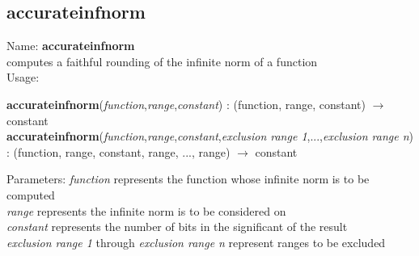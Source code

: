 \subsection{ accurateinfnorm }
\noindent Name: \textbf{accurateinfnorm}\\
computes a faithful rounding of the infinite norm of a function \\

\noindent Usage: 
\begin{center}
\textbf{accurateinfnorm}(\emph{function},\emph{range},\emph{constant}) : (\textsf{function}, \textsf{range}, \textsf{constant}) $\rightarrow$ \textsf{constant}\\
\textbf{accurateinfnorm}(\emph{function},\emph{range},\emph{constant},\emph{exclusion range 1},...,\emph{exclusion range n}) : (\textsf{function}, \textsf{range}, \textsf{constant}, \textsf{range}, ..., \textsf{range}) $\rightarrow$ \textsf{constant}\\
\end{center}
Parameters: 
\emph{function} represents the function whose infinite norm is to be computed\\
\emph{range} represents the infinite norm is to be considered on\\
\emph{constant} represents the number of bits in the significant of the result\\
\emph{exclusion range 1} through \emph{exclusion range n} represent ranges to be excluded \\

